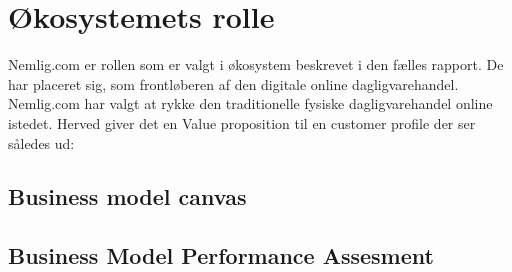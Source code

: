 \section{Økosystemets rolle}
Nemlig.com er rollen som er valgt i økosystem beskrevet i den fælles rapport. De har placeret sig, som frontløberen af den digitale online dagligvarehandel. Nemlig.com har valgt at rykke den traditionelle fysiske dagligvarehandel online istedet. Herved giver det en Value proposition til en customer profile der ser således ud:

\subsection{Business model canvas}

\subsection{Business Model Performance Assesment}

